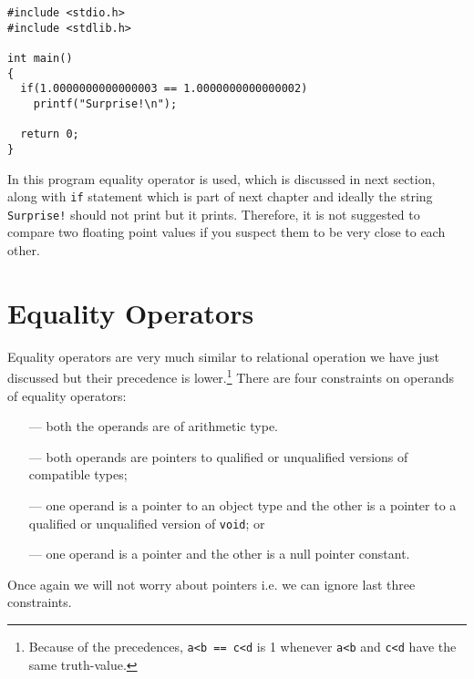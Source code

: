 \begin{Verbatim}[frame=single]
#include <stdio.h>
#include <stdlib.h>

int main()
{
  if(1.0000000000000003 == 1.0000000000000002)
    printf("Surprise!\n");

  return 0;
}

\end{Verbatim}

In this program equality operator is used, which is discussed in next section, 
along with \texttt{if} statement which is part of next chapter and ideally the  
string \texttt{Surprise!} should not print but it prints. Therefore, it is not 
suggested to compare two floating point values if you suspect them to be very 
close to each other.

\section{Equality Operators}
Equality operators are very much similar to relational operation we have just 
discussed but their precedence is lower.\footnote{Because of the precedences, 
\texttt{a<b == c<d} is 1 whenever \texttt{a<b} and \texttt{c<d} have the same 
truth-value.} There are four constraints on operands 
of equality operators:
\begin{itemize}
	\item[---] both the operands are of arithmetic type.
	\item[---] both operands are pointers to qualified or unqualified versions 
	of compatible types;
	\item[---] one operand is a pointer to an object type and the other is a 
	pointer to a qualified or unqualified version of \texttt{void}; or
	\item[---] one operand is a pointer and the other is a null pointer 
	constant.
\end{itemize}
Once again we will not worry about pointers i.e. we can ignore last three 
constraints.